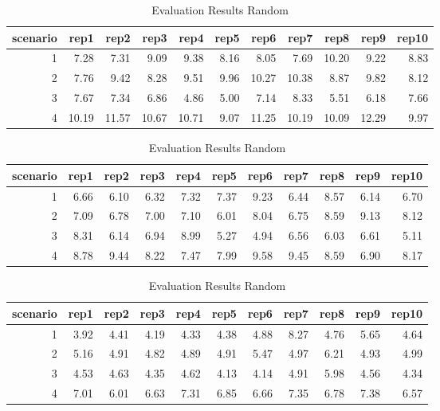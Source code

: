 \begin{table}
	\centering
	\begin{tabular}{ rrrrrrrrrrr }
		\hline
		scenario & rep1 & rep2 & rep3 & rep4 & rep5 & rep6 & rep7 & rep8 & rep9 & rep10\\
		\hline
		1 & 7.28 & 7.31 & 9.09 & 9.38 & 8.16 & 8.05 & 7.69 & 10.20 & 9.22 & 8.83 \\ 
		2 & 7.76 & 9.42 & 8.28 & 9.51 & 9.96 & 10.27 & 10.38 & 8.87 & 9.82 & 8.12 \\ 
		3 & 7.67 & 7.34 & 6.86 & 4.86 & 5.00 & 7.14 & 8.33 & 5.51 & 6.18 & 7.66 \\ 
		4 & 10.19 & 11.57 & 10.67 & 10.71 & 9.07 & 11.25 & 10.19 & 10.09 & 12.29 & 9.97 \\ 
		\hline
	\end{tabular}
	\caption{Evaluation Results Optimized}
	\label{tab:appendix:evaluation_optimized}
	\vspace{2em}
	\begin{tabular}{ rrrrrrrrrrr }
		\hline
		scenario & rep1 & rep2 & rep3 & rep4 & rep5 & rep6 & rep7 & rep8 & rep9 & rep10\\
		\hline
		1 & 6.66 & 6.10 & 6.32 & 7.32 & 7.37 & 9.23 & 6.44 & 8.57 & 6.14 & 6.70 \\
		2 & 7.09 & 6.78 & 7.00 & 7.10 & 6.01 & 8.04 & 6.75 & 8.59 & 9.13 & 8.12 \\ 
		3 & 8.31 & 6.14 & 6.94 & 8.99 & 5.27 & 4.94 & 6.56 & 6.03 & 6.61 & 5.11 \\ 
		4 & 8.78 & 9.44 & 8.22 & 7.47 & 7.99 & 9.58 & 9.45 & 8.59 & 6.90 & 8.17 \\ 
		\hline
	\end{tabular}

	\caption{Evaluation Results Default}
	\label{tab:appendix:evaluation_default}
	\vspace{2em}
	\begin{tabular}{ rrrrrrrrrrr }
		\hline
		scenario & rep1 & rep2 & rep3 & rep4 & rep5 & rep6 & rep7 & rep8 & rep9 & rep10\\
		\hline
		1 & 3.92 & 4.41 & 4.19 & 4.33 & 4.38 & 4.88 & 8.27 & 4.76 & 5.65 & 4.64 \\ 
		2 & 5.16 & 4.91 & 4.82 & 4.89 & 4.91 & 5.47 & 4.97 & 6.21 & 4.93 & 4.99 \\ 
		3 & 4.53 & 4.63 & 4.35 & 4.62 & 4.13 & 4.14 & 4.91 & 5.98 & 4.56 & 4.34 \\ 
		4 & 7.01 & 6.01 & 6.63 & 7.31 & 6.85 & 6.66 & 7.35 & 6.78 & 7.38 & 6.57 \\
		\hline
	\end{tabular}
	\caption{Evaluation Results Random}
	\label{tab:appendix:evaluation_random}
\end{table}





